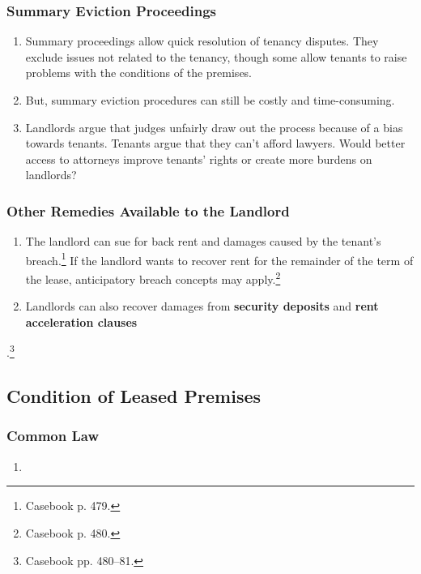 \subsubsection{Summary Eviction Proceedings} 

\begin{enumerate}
    \item Summary proceedings allow quick resolution of tenancy disputes. They 
    exclude issues not related to the tenancy, though some allow tenants to 
    raise problems with the conditions of the premises.
    \item But, summary eviction procedures can still be costly and 
    time-consuming.
    \item Landlords argue that judges unfairly draw out the process because of 
    a bias towards tenants. Tenants argue that they can't afford lawyers.  
    Would better access to attorneys improve tenants' rights or create more 
    burdens on landlords?
\end{enumerate}

\subsubsection{Other Remedies Available to the Landlord}

\begin{enumerate}
    \item The landlord can sue for back rent and damages caused by the 
    tenant's breach.\footnote{Casebook p. 479.} If the landlord wants to 
    recover rent for the remainder of the term of the lease, anticipatory 
    breach concepts may apply.\footnote{Casebook p. 480.}
    \item Landlords can also recover damages from \textbf{security deposits} 
    and \textbf{rent acceleration clauses}
\end{enumerate}.\footnote{Casebook pp. 480--81.}

\subsection{Condition of Leased Premises} %

\subsubsection{Common Law}

\begin{enumerate} %
    \item
\end{enumerate}

